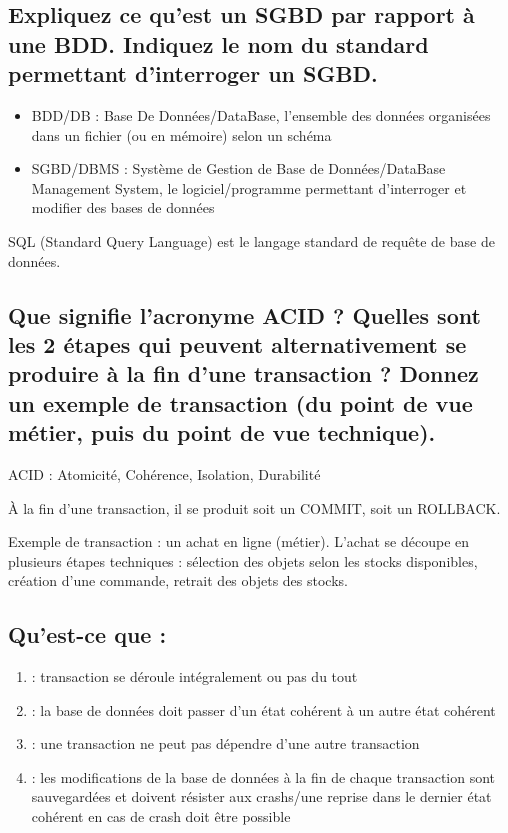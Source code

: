 \documentclass[11pt,a4paper]{article}
\begin{document}
\bigskip

\subsection{Expliquez ce qu'est un SGBD par rapport à une BDD. Indiquez le nom du standard permettant d'interroger un SGBD.}

\bigskip

\begin{itemize}
\item BDD/DB : Base De Données/DataBase, l'ensemble des données organisées dans un fichier (ou en mémoire) selon un schéma
\item SGBD/DBMS : Système de Gestion de Base de Données/DataBase Management System, le logiciel/programme permettant d'interroger et modifier des bases de données
\end{itemize}

SQL (Standard Query Language) est le langage standard de requête de base de données.

\bigskip

\subsection{Que signifie l'acronyme ACID ? Quelles sont les 2 étapes qui peuvent alternativement se produire à la fin d'une transaction ? Donnez un exemple de transaction (du point de vue métier, puis du point de vue technique).}

\bigskip

ACID : Atomicité, Cohérence, Isolation, Durabilité

\`A la fin d'une transaction, il se produit soit un COMMIT, soit un ROLLBACK.

Exemple de transaction : un achat en ligne (métier).
L'achat se découpe en plusieurs étapes techniques : sélection des objets selon les stocks disponibles, création d'une commande, retrait des objets des stocks.

\bigskip

\subsection{Qu'est-ce que :}
\begin{enumerate}
\item {} : transaction se déroule intégralement ou pas du tout
\item {} : la base de données doit passer d'un état cohérent à un autre état cohérent
\item {} : une transaction ne peut pas dépendre d'une autre transaction
\item {} : les modifications de la base de données à la fin de chaque transaction sont sauvegardées et doivent résister aux crashs/une reprise dans le dernier état cohérent en cas de crash doit être possible
\end{enumerate}
\end{document}
